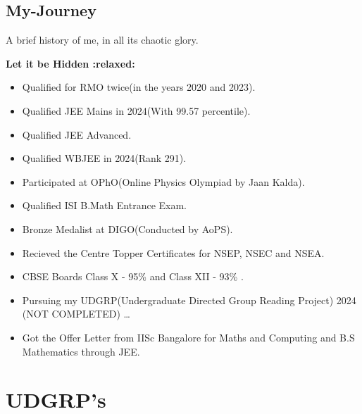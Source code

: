 \documentclass[
  letterpaper,
  DIV=11,
  numbers=noendperiod]{scrreprt}
\providecommand{\tightlist}{%
  \setlength{\itemsep}{0pt}\setlength{\parskip}{0pt}}\usepackage{longtable,booktabs,array}
\begin{document}

\chapter*{My-Journey}\label{my-journey}


A brief history of me, in all its chaotic glory.

\hfill\break

\begin{tcolorbox}[enhanced jigsaw, breakable, rightrule=.15mm, opacityback=0, arc=.35mm, colframe=quarto-callout-note-color-frame, colback=white, toprule=.15mm, left=2mm, bottomrule=.15mm, leftrule=.75mm]

\vspace{-3mm}\textbf{Let it be Hidden :relaxed:}\vspace{3mm}

\begin{itemize}
\tightlist
\item
  Qualified for RMO twice(in the years 2020 and 2023).
\item
  Qualified JEE Mains in 2024(With 99.57 percentile).
\item
  Qualified JEE Advanced.
\item
  Qualified WBJEE in 2024(Rank 291).
\item
  Participated at OPhO(Online Physics Olympiad by Jaan Kalda).
\item
  Qualified ISI B.Math Entrance Exam.
\item
  Bronze Medalist at DIGO(Conducted by AoPS).
\item
  Recieved the Centre Topper Certificates for NSEP, NSEC and NSEA.
\item
  CBSE Boards Class X - 95\% and Class XII - 93\% .
\item
  Pursuing my UDGRP(Undergraduate Directed Group Reading Project) 2024
  (NOT COMPLETED) \ldots{}
\item
  Got the Offer Letter from IISc Bangalore for Maths and Computing and
  B.S Mathematics through JEE.
\end{itemize}

\end{tcolorbox}

\part{UDGRP's}
\end{document}
